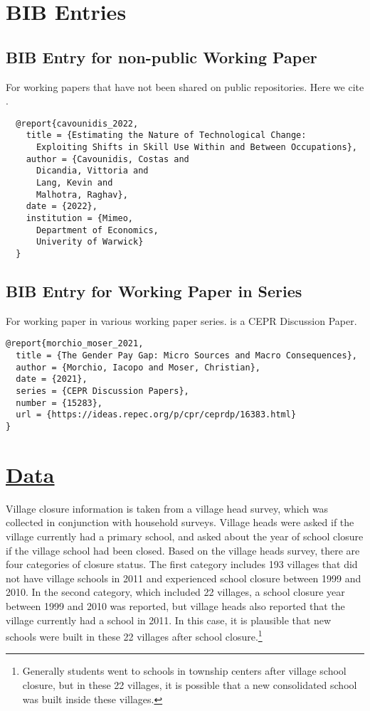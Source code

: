 \documentclass[12pt,english]{article}
\begin{document}
\section{BIB Entries}

\subsection{BIB Entry for non-public Working Paper}

For working papers that have not been shared on public repositories. Here we cite \textcite{cavounidis_2022}.

\begin{verbatim}
  @report{cavounidis_2022,
    title = {Estimating the Nature of Technological Change:
      Exploiting Shifts in Skill Use Within and Between Occupations},
    author = {Cavounidis, Costas and
      Dicandia, Vittoria and
      Lang, Kevin and
      Malhotra, Raghav},
    date = {2022},
    institution = {Mimeo,
      Department of Economics,
      Univerity of Warwick}
  }
\end{verbatim}

\subsection{BIB Entry for Working Paper in Series}

For working paper in various working paper series. \textcite{morchio_moser_2021} is a CEPR Discussion Paper.

\begin{verbatim}
@report{morchio_moser_2021,
  title = {The Gender Pay Gap: Micro Sources and Macro Consequences},
  author = {Morchio, Iacopo and Moser, Christian},
  date = {2021},
  series = {CEPR Discussion Papers},
  number = {15283},
  url = {https://ideas.repec.org/p/cpr/ceprdp/16383.html}
}
\end{verbatim}

\section{\href{https://papers.ssrn.com/sol3/papers.cfm?abstract_id=3140132}{Data}}

Village closure information is taken from a village head survey, which was collected in conjunction with household surveys. Village heads were asked if the village currently had a primary school, and asked about the year of school closure if the village school had been closed. Based on the village heads survey, there are four categories of closure status. The first category includes 193 villages that did not have village schools in 2011 and experienced school closure between 1999 and 2010. In the second category, which included 22 villages, a school closure year between 1999 and 2010 was reported, but village heads also reported that the village currently had a school in 2011. In this case, it is plausible that new schools were built in these 22 villages after school closure.\footnote{Generally students went to schools in township centers after village school closure, but in these 22 villages, it is possible that a new consolidated school was built inside these villages.}

\pagebreak
\begingroup
{}
\setlength\bibitemsep{3pt}
\printbibliography
\endgroup
\pagebreak
\end{document}
